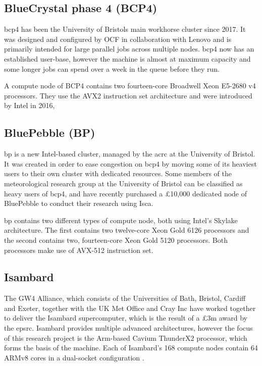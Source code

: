 \documentclass[a4paper,11pt]{report}
\begin{document}

\subsection{BlueCrystal phase 4 (BCP4)}
\gls{bcp4} has been the University of Bristols main workhorse cluster since 2017. It was designed and configured by OCF in collaboration with Lenovo and is primarily intended for large parallel jobs across multiple nodes. \gls{bcp4} now has an established user-base, however the machine is almost at maximum capacity and some longer jobs can spend over a week in the queue before they run.
\par
A compute node of BCP4 contains two fourteen-core Broadwell Xeon E5-2680 v4 processors. They use the AVX2 instruction set architecture and were introduced by Intel in 2016, 

\subsection{BluePebble (BP)}
\gls{bp} is a new Intel-based cluster, managed by the \gls{acrc} at the University of Bristol. It was created in order to ease congestion on \gls{bcp4} by moving some of its heaviest users to their own cluster with dedicated resources. Some members of the meteorological research group at the University of Bristol can be classified as heavy users of \gls{bcp4}, and have recently purchased a £10,000 dedicated node of BluePebble to conduct their research using Isca. 
\par
\gls{bp} contains two different types of compute node, both using Intel's Skylake architecture. The first contains two twelve-core Xeon Gold 6126 processors and the second contains two, fourteen-core Xeon Gold 5120 processors. Both processors make use of AVX-512 instruction set. 


\subsection{Isambard}
The GW4 Alliance, which consists of the Universities of Bath, Bristol, Cardiff and Exeter, together with the UK Met Office and Cray Inc have worked together to deliver the Isambard supercomputer, which is the result of a £3m award by the \gls{epsrc}. Isambard provides multiple advanced architectures, however the focus of this research project is the Arm-based Cavium ThunderX2 processor, which forms the basis of the machine. Each of Isambard's 168 compute nodes contain 64 ARMv8 cores in a dual-socket configuration \cite{thunderprocessor2018brief}. 
\end{document}
